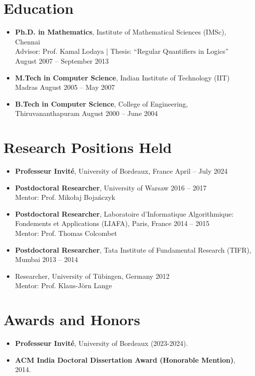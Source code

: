 \documentclass[11pt]{article}
\begin{document}
\section*{Education}
\begin{itemize}
    \item \textbf{Ph.D. in Mathematics}, Institute of Mathematical Sciences (IMSc), Chennai \\
    Advisor: Prof. Kamal Lodaya | Thesis: ``Regular Quantifiers in Logics'' \hfill August 2007 -- September 2013
    \item \textbf{M.Tech in Computer Science}, Indian Institute of Technology (IIT) Madras \hfill August 2005 -- May 2007
    \item \textbf{B.Tech in Computer Science}, College of Engineering, Thiruvananthapuram \hfill August 2000 -- June 2004
\end{itemize}

\section*{Research Positions Held}
\begin{itemize}
    \item \textbf{Professeur Invit\'e}, University of Bordeaux, France \hfill April -- July 2024
    \item \textbf{Postdoctoral Researcher}, University of Warsaw \hfill 2016 -- 2017 \\
    Mentor: Prof. Mikołaj Bojańczyk
    \item \textbf{Postdoctoral Researcher}, Laboratoire d'Informatique Algorithmique: Fondements et Applications (LIAFA), Paris, France \hfill 2014 -- 2015 \\
    Mentor: Prof. Thomas Colcombet
    \item \textbf{Postdoctoral Researcher}, Tata Institute of Fundamental Research (TIFR), Mumbai \hfill 2013 -- 2014
    \item Researcher, University of Tübingen, Germany \hfill 2012 \\
    Mentor: Prof. Klaus-Jörn Lange
\end{itemize}

\section*{Awards and Honors}
\begin{itemize}
    \item \textbf{Professeur Invit\'e}, University of Bordeaux (2023-2024).
    \item \textbf{ACM India Doctoral Dissertation Award (Honorable Mention)}, 2014.
\end{itemize}
\end{document}
